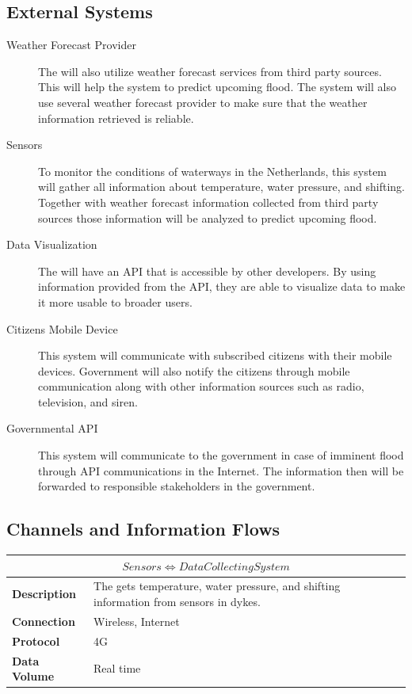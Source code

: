 \subsection{External Systems}
\begin{description}
	\item[Weather Forecast Provider] The \ProjectName{} will also utilize weather forecast services from third party sources. This will help the system to predict upcoming flood. The system will also use several weather forecast provider to make sure that the weather information retrieved is reliable.
	\item[Sensors] To monitor the conditions of waterways in the Netherlands, this system will gather all information about temperature, water pressure, and shifting. Together with weather forecast information collected from third party sources those information will be analyzed to predict upcoming flood.
	\item[Data Visualization] The \ProjectName{} will have an API that is accessible by other developers. By using information provided from the API, they are able to visualize data to make it more usable to broader users. 
	\item[Citizens Mobile Device] This system will communicate with subscribed citizens with their mobile devices. Government will also notify the citizens through mobile communication along with other information sources such as radio, television, and siren.
	\item[Governmental API] This system will communicate to the government in case of imminent flood through API communications in the Internet. The information then will be forwarded to responsible stakeholders in the government.
\end{description}

\subsection{Channels and Information Flows}
\begin{table}[!htbp]
	\centering
    \begin{tabular}{L{} L{}}
    \toprule
     \\ \midrule
    \textbf{Description} & The \ProjectName{} gets temperature, water pressure, and shifting information from sensors in dykes. \\
    \textbf{Connection} & Wireless, Internet \\
    \textbf{Protocol} & 4G \\
    \textbf{Data Volume} & Real time \\
    \bottomrule
    \end{tabular}
\end{table}

